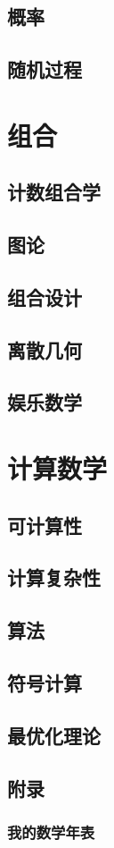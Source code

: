 \documentclass{book}
\begin{document}
\chapter{概率}

\chapter{随机过程}

\part{组合}
\chapter{计数组合学}

\chapter{图论}

\chapter{组合设计}

\chapter{离散几何}

\chapter{娱乐数学}


\part{计算数学}
\chapter{可计算性}

\chapter{计算复杂性}


\chapter{算法}


\chapter{符号计算}

\chapter{最优化理论}

\chapter*{附录}
\section*{我的数学年表}


\end{document}
